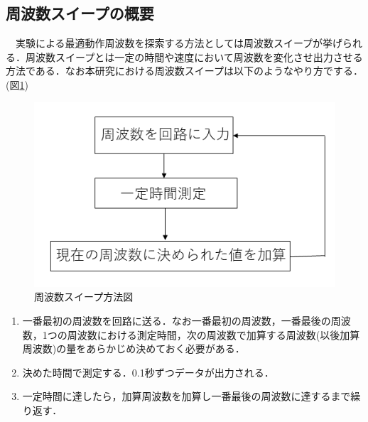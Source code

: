 \documentclass[12pt]{jarticle}
\begin{document}
\subsection{周波数スイープの概要}
　実験による最適動作周波数を探索する方法としては周波数スイープが挙げられる．周波数スイープとは一定の時間や速度において周波数を変化させ出力させる方法である．なお本研究における周波数スイープは以下のようなやり方でする．(図\ref{fig:freq_sweep})
 \begin{figure}[H]
	\centering
	\includegraphics[]{freqency_sweep.png}
	\caption{周波数スイープ方法図}
	\label{fig:freq_sweep}
\end{figure}
\begin{enumerate}
	\item 一番最初の周波数を回路に送る．なお一番最初の周波数，一番最後の周波数，1つの周波数における測定時間，次の周波数で加算する周波数(以後加算周波数)の量をあらかじめ決めておく必要がある．
	\item 決めた時間で測定する．0.1秒ずつデータが出力される．
	\item 一定時間に達したら，加算周波数を加算し一番最後の周波数に達するまで繰り返す．
\end{enumerate}
\clearpage
\end{document}
